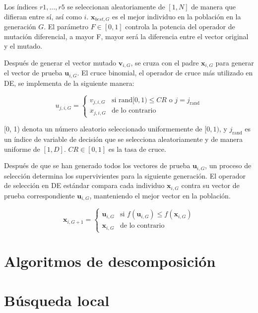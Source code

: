 Los índices \( r1, \ldots, r5 \) se seleccionan aleatoriamente de \([1, N]\) de manera que difieran entre sí, así como \( i \). \( \mathbf{x}_{best,G} \) es el mejor individuo en la población en la generación \( G \). El parámetro \( F \in [0, 1] \) controla la potencia del operador de mutación diferencial, a mayor F, mayor será la diferencia entre el vector original y el mutado.

Después de generar el vector mutado \( \mathbf{v}_{i,G} \), se cruza con el padre \( \mathbf{x}_{i,G} \) para generar el vector de prueba \( \mathbf{u}_{i,G} \). El cruce binomial, el operador de cruce más utilizado en DE, se implementa de la siguiente manera:

\[
u_{j,i,G} =
\begin{cases}
v_{j,i,G} & \text{si } \text{rand}[0, 1) \leq CR \text{ o } j = j_{\text{rand}} \\
x_{j,i,G} & \text{de lo contrario}
\end{cases}
\]

[0, 1) denota un número aleatorio seleccionado uniformemente de \([0, 1)\), y \( j_{\text{rand}} \) es un índice de variable de decisión que se selecciona aleatoriamente y de manera uniforme de \([1, D]\). \( CR \in [0, 1] \) es la tasa de cruce.

Después de que se han generado todos los vectores de prueba \( \mathbf{u}_{i,G} \), un proceso de selección determina los supervivientes para la siguiente generación. El operador de selección en DE estándar compara cada individuo \( \mathbf{x}_{i,G} \) contra su vector de prueba correspondiente \( \mathbf{u}_{i,G} \), manteniendo el mejor vector en la población.

\[
\mathbf{x}_{i,G+1} = 
\begin{cases} 
\mathbf{u}_{i,G} & \text{si } f(\mathbf{u}_{i,G}) \leq f(\mathbf{x}_{i,G}) \\ 
\mathbf{x}_{i,G} & \text{de lo contrario} 
\end{cases} 
\]

\section{Algoritmos de descomposición}

\section{Búsqueda local}



\endinput
